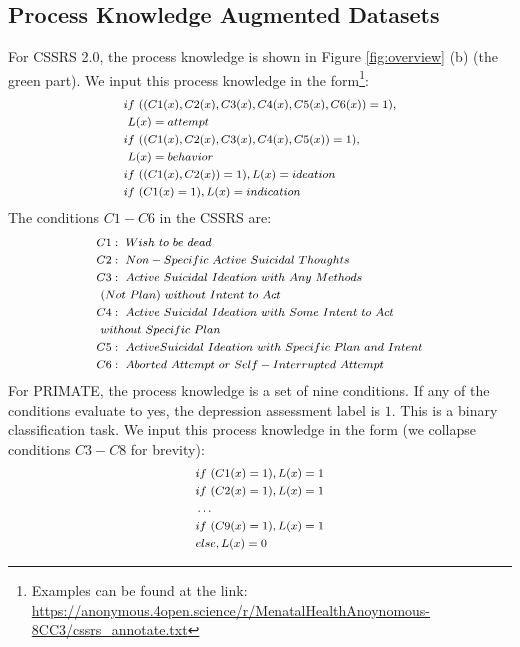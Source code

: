 \documentclass[letterpaper]{article} %
\begin{document}
\subsection{Process Knowledge Augmented Datasets}
For CSSRS 2.0, the process knowledge is shown in Figure \ref{fig:overview} (b) (the green part). We input this process knowledge in the form\footnote{Examples can be found at the link: \url{https://anonymous.4open.science/r/MenatalHealthAnoynomous-8CC3/cssrs_annotate.txt}}:
\begin{equation*}
\footnotesize
\begin{split}
    & if~((C1(x),C2(x),C3(x),C4(x),C5(x),C6(x)) = 1),\\
    &~L(x) = attempt \\
    & if~((C1(x),C2(x),C3(x),C4(x),C5(x)) = 1),\\
    &~L(x) = behavior \\
    & if~((C1(x),C2(x))=1), L(x) = ideation\\
    & if~(C1(x)=1), L(x)=indication
\end{split}
\end{equation*}
The conditions $C1-C6$ in the CSSRS are:
\begin{equation*}
\footnotesize
\begin{split}
    & C1:~Wish~to~be~dead \\
    & C2:~Non-Specific~Active~Suicidal~Thoughts \\
    & C3:~Active~Suicidal~Ideation~with~Any~Methods\\
    &~(Not~Plan)~without~Intent~to~Act \\
    & C4:~Active~Suicidal~Ideation~with~Some~Intent~to~Act\\ 
    &~without~Specific~Plan\\
    & C5:~Active Suicidal~Ideation~with~Specific~Plan~and~Intent\\
    & C6:~Aborted~Attempt~or~Self-Interrupted~Attempt
\end{split}
\end{equation*}
For PRIMATE, the process knowledge is a set of nine conditions. If any of the conditions evaluate to yes, the depression assessment label is $1$. This is a binary classification task. We input this process knowledge in the form (we collapse conditions $C3-C8$ for brevity):
\begin{equation*}
\footnotesize
\begin{split}
    & if~(C1(x)=1), L(x) = 1\\
    & if~(C2(x)=1), L(x) = 1\\
    & \dots \\
    & if~(C9(x)=1), L(x) = 1\\
    & else, L(x) = 0
\end{split}
\end{equation*}
\end{document}
